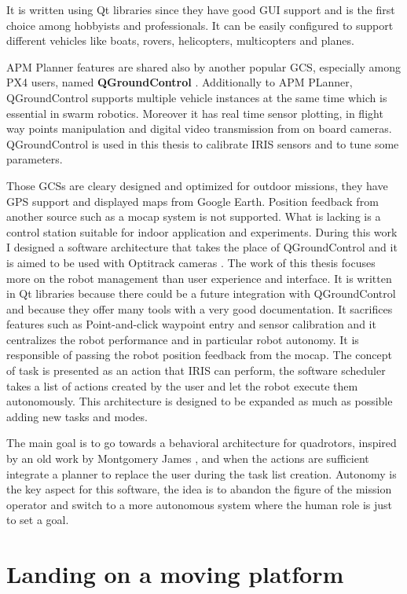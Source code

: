 It is written using Qt libraries since they have good GUI support and is the first choice among hobbyists and professionals. It can be easily configured to  support different vehicles like boats, rovers, helicopters, multicopters and planes. \par APM Planner features are shared also by another popular GCS, especially among PX4 users, named \textbf{QGroundControl} \cite{QGround}. Additionally to APM PLanner, QGroundControl supports multiple vehicle instances at the same time which is essential in swarm robotics.  Moreover it has real time sensor plotting, in flight way points manipulation and digital video transmission from on board cameras. QGroundControl is used in this thesis to calibrate IRIS sensors and to tune some parameters. \par Those GCSs are cleary designed and optimized for outdoor missions, they have GPS support and displayed maps from Google Earth. Position feedback from another source such as a mocap system is not supported. What is lacking is a control station suitable for indoor application and experiments. During this work I designed a software architecture that takes the place of QGroundControl and it is aimed to be used with Optitrack cameras . The work of this thesis focuses more on the robot management than user experience and interface. It is written in Qt libraries because there could be a future integration with QGroundControl and because they offer many tools with a very good documentation. It sacrifices features such as Point-and-click waypoint entry and sensor calibration and it centralizes the robot performance and in particular robot autonomy. It is responsible of passing the robot position feedback from the mocap. The concept of task is presented as an action that IRIS can perform, the software scheduler takes a list of actions created by the user and let the robot execute them autonomously. This architecture is designed to be expanded as much as possible adding new tasks and modes.\par The main goal is to go towards a behavioral architecture for quadrotors, inspired by an old work by Montgomery James \cite{Montgomery1995}, and when the actions are sufficient integrate a planner to replace the user during the task list creation. Autonomy is the key aspect for this software, the idea is to abandon the figure of the mission operator and switch to a more autonomous system where the human role is just to set a goal.

\section{Landing on a moving platform}

